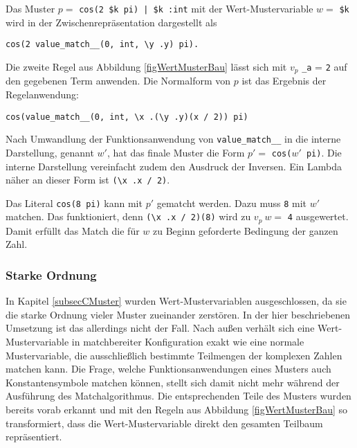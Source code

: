 \begin{beispiel}
Das Muster $p =$ \verb~cos(2 $k pi) | $k :int~ mit der Wert-Mustervariable $w =$ \verb|$k| wird in der Zwischenrepräsentation dargestellt als 
\begin{unbreakable}\begin{verbatim}
cos(2 value_match__(0, int, \y .y) pi). 
\end{verbatim}\end{unbreakable}
Die zweite Regel aus Abbildung \ref{figWertMusterBau} lässt sich mit $v_p$ \verb|_a| = \verb|2| auf den gegebenen Term anwenden. Die Normalform von $p$ ist das Ergebnis der Regelanwendung:
\begin{unbreakable}\begin{verbatim}
cos(value_match__(0, int, \x .(\y .y)(x / 2)) pi)
\end{verbatim}\end{unbreakable}
Nach Umwandlung der Funktionsanwendung von \verb|value_match__| in die interne Darstellung, genannt $w'$, hat das finale Muster die Form $p' =$ \verb|cos(|$w'$\verb| pi)|. 
Die interne Darstellung vereinfacht zudem den Ausdruck der Inversen. Ein Lambda näher an dieser Form ist \verb|(\x .x / 2)|.

Das Literal \verb|cos(8 pi)| kann mit $p'$ gematcht werden. Dazu muss \verb|8| mit $w'$ matchen. Das funktioniert, denn \verb|(\x .x / 2)(8)| wird zu $v_p~w =$ \verb|4| ausgewertet. Damit erfüllt das Match die für $w$ zu Beginn geforderte Bedingung der ganzen Zahl. 
\end{beispiel}

\subsubsection{Starke Ordnung}
In Kapitel \ref{subsecCMuster} wurden Wert-Mustervariablen ausgeschlossen, da sie die starke Ordnung vieler Muster zueinander zerstören. In der hier beschriebenen Umsetzung ist das allerdings nicht der Fall. Nach außen verhält sich eine Wert-Mustervariable in matchbereiter Konfiguration exakt wie eine normale Mustervariable, die ausschließlich bestimmte Teilmengen der komplexen Zahlen matchen kann. Die Frage, welche Funktionsanwendungen eines Musters auch Konstantensymbole matchen können, stellt sich damit nicht mehr während der Ausführung des Matchalgorithmus. Die entsprechenden Teile des Musters wurden bereits vorab erkannt und mit den Regeln aus Abbildung \ref{figWertMusterBau} so transformiert, dass die Wert-Mustervariable direkt den gesamten Teilbaum repräsentiert.

